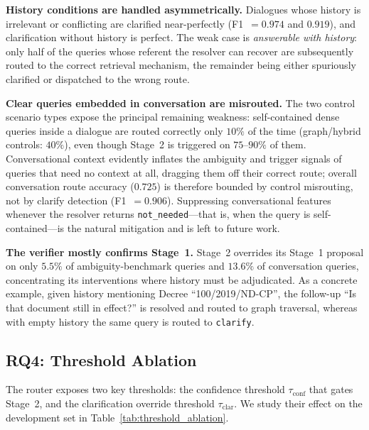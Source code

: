 \documentclass[pdflatex,sn-mathphys-num]{sn-jnl}
\begin{document}
\noindent\textbf{History conditions are handled asymmetrically.} Dialogues
whose history is irrelevant or conflicting are clarified near-perfectly
(F1~$=0.974$ and $0.919$), and clarification without history is perfect. The
weak case is \emph{answerable with history}: only half of the queries whose
referent the resolver can recover are subsequently routed to the correct
retrieval mechanism, the remainder being either spuriously clarified or
dispatched to the wrong route.

\noindent\textbf{Clear queries embedded in conversation are misrouted.} The
two control scenario types expose the principal remaining weakness:
self-contained dense queries inside a dialogue are routed correctly only
$10\%$ of the time (graph/hybrid controls: $40\%$), even though Stage~2 is
triggered on $75$--$90\%$ of them. Conversational context evidently inflates
the ambiguity and trigger signals of queries that need no context at all,
dragging them off their correct route; overall conversation route accuracy
($0.725$) is therefore bounded by control misrouting, not by clarify
detection (F1~$=0.906$). Suppressing conversational features whenever the
resolver returns \texttt{not\_needed}---that is, when the query is
self-contained---is the natural mitigation and is left to future work.

\noindent\textbf{The verifier mostly confirms Stage~1.} Stage~2 overrides its
Stage~1 proposal on only $5.5\%$ of ambiguity-benchmark queries and $13.6\%$
of conversation queries, concentrating its interventions where history must
be adjudicated. As a concrete example, given history mentioning
Decree ``100/2019/ND-CP'', the follow-up ``Is that document still in
effect?'' is resolved and routed to graph traversal, whereas with empty
history the same query is routed to \texttt{clarify}.

\subsection{RQ4: Threshold Ablation}\label{subsec:rq4}

The router exposes two key thresholds: the confidence threshold
$\tau_{\mathrm{conf}}$ that gates Stage~2, and the clarification override
threshold $\tau_{\mathrm{clar}}$. We study their effect on the development set
in Table~\ref{tab:threshold_ablation}.
\end{document}
